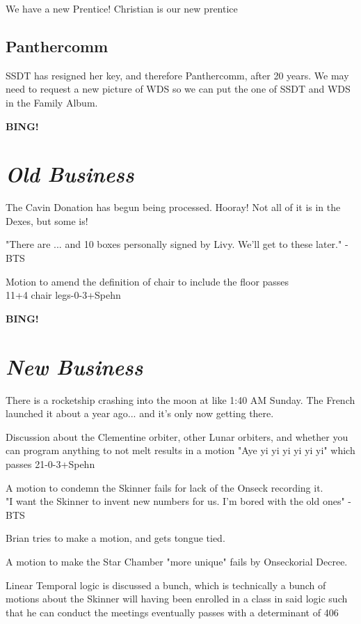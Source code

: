 \documentclass[10pt]{article}
\newcommand{\bing}{{\bf BING!} }
\newcommand{\goto}[1]{\bing \vskip 12pt \section*{{\em{#1}}}}
\begin{document}
We have a new Prentice! Christian is our new prentice

\subsection*{Panthercomm}
SSDT has resigned her key, and therefore Panthercomm, after 20 years. 
We may need to request a new picture of WDS so we can put the one of
SSDT and WDS in the Family Album.




\goto{Old Business}
The Cavin Donation has begun being processed. Hooray! Not all of it is
in the Dexes, but some is!

"There are ... and 10 boxes personally signed by Livy. We'll get to
these later." -BTS

Motion to amend the definition of chair to include the floor passes\\
11+4 chair legs-0-3+Spehn


\goto{New Business}
There is a rocketship crashing into the moon at like 1:40 AM
Sunday. The French launched it about a year ago... and it's only now
getting there. 

Discussion about the Clementine orbiter, other Lunar orbiters, and
whether you can program anything to not melt results in a motion
"Aye yi yi yi yi yi yi" which passes 21-0-3+Spehn

A motion to condemn the Skinner fails for lack of the Onseck recording
it.\\

"I want the Skinner to invent new numbers for us. I'm bored with the
old ones" -BTS

Brian tries to make a motion, and gets tongue tied.

A motion to make the Star Chamber "more unique" fails by Onseckorial Decree.

Linear Temporal logic is discussed a bunch, which is technically a
bunch of motions about the Skinner will having been enrolled in a
class in said logic such that he can conduct the meetings eventually
passes with a determinant of 406 
\end{document}
